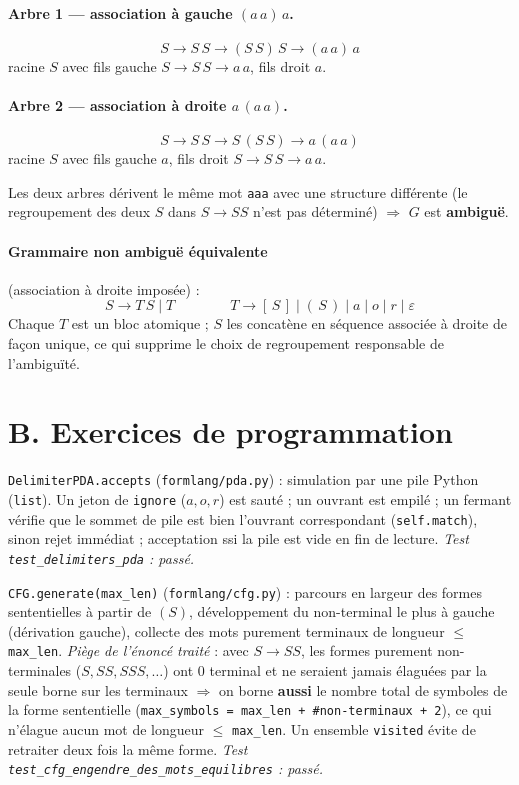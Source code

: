 \documentclass[11pt,a4paper]{scrartcl}
\begin{document}
\paragraph{Arbre 1 — association à gauche $(a\,a)\,a$.}
$$S \to S\,S \to (S\,S)\,S \to (a\,a)\,a$$
racine $S$ avec fils gauche $S\to S\,S \to a\,a$, fils droit $a$.

\paragraph{Arbre 2 — association à droite $a\,(a\,a)$.}
$$S \to S\,S \to S\,(S\,S) \to a\,(a\,a)$$
racine $S$ avec fils gauche $a$, fils droit $S\to S\,S\to a\,a$.

Les deux arbres dérivent le même mot \texttt{aaa} avec une structure différente (le
regroupement des deux $S$ dans $S\to SS$ n'est pas déterminé) $\Rightarrow$ $G$ est
\textbf{ambiguë}.

\paragraph{Grammaire non ambiguë équivalente} (association à droite imposée) :
$$S \rightarrow T\,S \mid T \qquad\qquad T \rightarrow [\,S\,] \mid (\,S\,) \mid a \mid o \mid r \mid \varepsilon$$
Chaque $T$ est un bloc atomique ; $S$ les concatène en séquence associée à droite de
façon unique, ce qui supprime le choix de regroupement responsable de l'ambiguïté.

\section*{B. Exercices de programmation}

\begin{description}[leftmargin=1.6em,style=nextline]
  \item[E2.1] \texttt{DelimiterPDA.accepts} (\texttt{formlang/pda.py}) : simulation
    par une pile Python (\texttt{list}). Un jeton de \texttt{ignore}
    ($a,o,r$) est sauté ; un ouvrant est empilé ; un fermant vérifie que le sommet de
    pile est bien l'ouvrant correspondant (\texttt{self.match}), sinon rejet immédiat ;
    acceptation ssi la pile est vide en fin de lecture. \emph{Test
    \texttt{test\_delimiters\_pda} : passé.}
  \item[E2.2] \texttt{CFG.generate(max\_len)} (\texttt{formlang/cfg.py}) : parcours en
    largeur des formes sententielles à partir de $(S)$, développement du non-terminal
    le plus à gauche (dérivation gauche), collecte des mots purement terminaux de
    longueur $\le$ \texttt{max\_len}. \emph{Piège de l'énoncé traité} : avec
    $S\to SS$, les formes purement non-terminales ($S,SS,SSS,\dots$) ont 0 terminal et
    ne seraient jamais élaguées par la seule borne sur les terminaux
    $\Rightarrow$ on borne \textbf{aussi} le nombre total de symboles de la forme
    sententielle (\texttt{max\_symbols = max\_len + \#non-terminaux + 2}), ce qui
    n'élague aucun mot de longueur $\le$ \texttt{max\_len}. Un ensemble
    \texttt{visited} évite de retraiter deux fois la même forme. \emph{Test
    \texttt{test\_cfg\_engendre\_des\_mots\_equilibres} : passé.}
\end{description}
\end{document}
